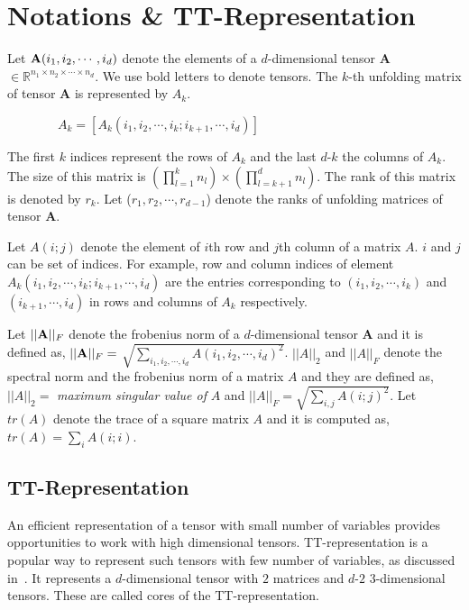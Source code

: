 \documentclass[runningheads]{llncs}
\newcommand{\tensor}[1]{{\cal\textbf{#1}\xspace}}
\begin{document}
\section{Notations \& TT-Representation}
\label{sec:notationsAndTT}
\noindent Let $\tensor{A}(i_1,i_2,\cdots, i_d)$ denote the elements of a $d$-dimensional tensor \tensor{A} $\in \mathbb{R}^{n_1 \times n_2 \times \cdots \times n_d}$. We use bold letters to denote tensors. The $k$-th unfolding matrix of tensor \tensor{A} is represented by $A_k$.

$\qquad\qquad A_k = [A_k(i_1, i_2,\cdots, i_k; i_{k+1},\cdots ,i_d)]$

\noindent The first $k$ indices represent the rows of $A_k$ and the last $d$-$k$ the columns of $A_k$. The size of this matrix is $(\prod_{l=1}^{k}n_l)\times(\prod_{l=k+1}^{d}n_l)$. The rank of this matrix is denoted by $r_k$. Let ($r_1, r_2,\cdots, r_{d-1}$) denote the ranks of unfolding matrices of tensor \tensor{A}.

Let $A(i;j)$ denote the element of $i$th row and $j$th column of a matrix $A$. $i$ and $j$ can be set of indices. For example, row and column indices of element $A_k(i_1, i_2,\cdots, i_k; i_{k+1},\cdots ,i_d)$ are the entries corresponding to $(i_1, i_2,\cdots, i_k)$ and $(i_{k+1},\cdots ,i_d)$ in rows and columns of $A_k$ respectively.

Let $||\tensor{A}||_F$ denote the frobenius norm of a $d$-dimensional tensor \tensor{A} and it is defined as, $||\tensor{A}||_F=$ $\sqrt{\sum_{i_1, i_2, \cdots, i_d}A(i_1,i_2,\cdots, i_d)^2 }$. $||A||_2$ and $||A||_F$ denote the spectral norm and the frobenius norm of a matrix $A$ and they are defined as, $||A||_2 = $ \textit{maximum singular value of} $A$ and $||A||_F = \sqrt{\sum_{i,j} A(i;j)^2}$. Let $tr(A)$ denote the trace of a square matrix $A$ and it is computed as, $tr(A) = \sum_i A(i;i)$.

\subsection{TT-Representation}
An efficient representation of a tensor with small number of variables provides opportunities to work with high dimensional tensors. TT-representation is a popular way to represent such tensors with few number of variables, as discussed in~\cite{tt}. It represents a $d$-dimensional tensor with $2$ matrices and $d$-$2$ $3$-dimensional tensors. These are called cores of the TT-representation.
\end{document}
